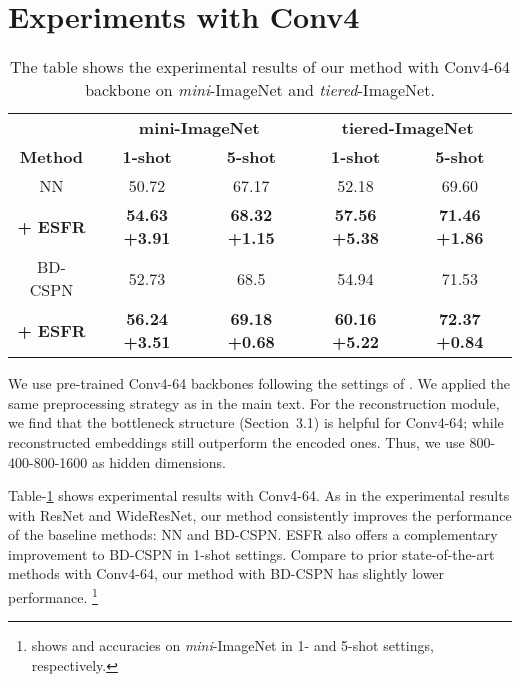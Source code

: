 \documentclass{article}
\begin{document}
\section{Experiments with Conv4}
\begin{table}[h]
\label{table:conv4}
	\begin{small}
		\caption{The table shows the experimental results of our method with Conv4-64 backbone on \textit{mini}-ImageNet and \textit{tiered}-ImageNet.}
		\begin{center}
			\begin{tabular}{ccccc}
				\hline
				\textbf{} & \multicolumn{2}{c}{\textbf{mini-ImageNet}} & \multicolumn{2}{c}{\textbf{tiered-ImageNet}} \\
				\textbf{Method} & \textbf{1-shot} & \textbf{5-shot} & \textbf{1-shot} & \textbf{5-shot} \\ \hline
				NN & 50.72 & 67.17 & 52.18 & 69.60 \\
				\rowcolor[HTML]{EFEFEF} 
				\textbf{+ ESFR} & \textbf{54.63 {\scriptsize+3.91}} & \textbf{68.32 {\scriptsize+1.15}} & \textbf{57.56 {\scriptsize+5.38}} & \textbf{71.46 {\scriptsize+1.86}} \\ \hline
				BD-CSPN & 52.73 & 68.5 & 54.94 & 71.53 \\
				\rowcolor[HTML]{EFEFEF} 
				\textbf{+ ESFR} & \textbf{56.24 {\scriptsize+3.51}} & \textbf{69.18 {\scriptsize+0.68}} & \textbf{60.16 {\scriptsize+5.22}} & \textbf{72.37 {\scriptsize+0.84}} \\ \hline
			\end{tabular}
		\end{center}
	\end{small}
\end{table}
We use pre-trained Conv4-64 backbones following the settings of \citet{SimpleShot}.
We applied the same preprocessing strategy as in the main text.
For the reconstruction module, we find that the bottleneck structure (Section~3.1) is helpful for Conv4-64; while reconstructed embeddings still outperform the encoded ones.
Thus, we use 800-400-800-1600 as hidden dimensions.

Table-\ref{table:conv4} shows experimental results with Conv4-64.
As in the experimental results with ResNet and WideResNet, our method consistently improves the performance of the baseline methods: NN and BD-CSPN.
ESFR also offers a complementary improvement to BD-CSPN \cite{BDCSPN} in 1-shot settings.
Compare to prior state-of-the-art methods with Conv4-64, our method with BD-CSPN has slightly lower performance.
\footnote{\citet{SIB} shows  and  accuracies on {\it mini}-ImageNet in 1- and 5-shot settings, respectively.} 
\end{document}
